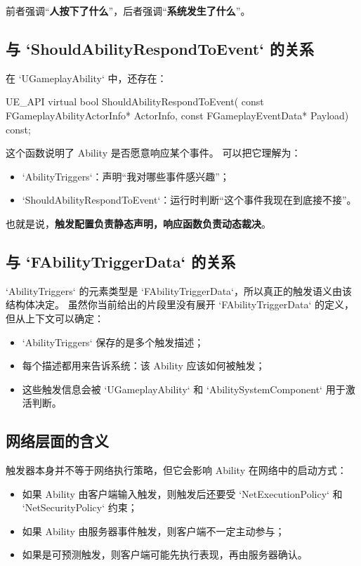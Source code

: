 \documentclass[10pt,CJKmath]{ctexart}
\begin{document}
前者强调“\textbf{人按下了什么}”，后者强调“\textbf{系统发生了什么}”。

\subsection{与 `ShouldAbilityRespondToEvent` 的关系}

在 `UGameplayAbility` 中，还存在：

\begin{code}
	UE_API virtual bool ShouldAbilityRespondToEvent(
	const FGameplayAbilityActorInfo* ActorInfo,
	const FGameplayEventData* Payload) const;
\end{code}

这个函数说明了 Ability 是否愿意响应某个事件。  
可以把它理解为：

\begin{itemize}
	\item `AbilityTriggers`：声明“我对哪些事件感兴趣”；
	\item `ShouldAbilityRespondToEvent`：运行时判断“这个事件我现在到底接不接”。
\end{itemize}

也就是说，\textbf{触发配置负责静态声明，响应函数负责动态裁决}。

\subsection{与 `FAbilityTriggerData` 的关系}

`AbilityTriggers` 的元素类型是 `FAbilityTriggerData`，所以真正的触发语义由该结构体决定。  
虽然你当前给出的片段里没有展开 `FAbilityTriggerData` 的定义，但从上下文可以确定：

\begin{itemize}
	\item `AbilityTriggers` 保存的是多个触发描述；
	\item 每个描述都用来告诉系统：该 Ability 应该如何被触发；
	\item 这些触发信息会被 `UGameplayAbility` 和 `AbilitySystemComponent` 用于激活判断。
\end{itemize}

\subsection{网络层面的含义}

触发器本身并不等于网络执行策略，但它会影响 Ability 在网络中的启动方式：

\begin{itemize}
	\item 如果 Ability 由客户端输入触发，则触发后还要受 `NetExecutionPolicy` 和 `NetSecurityPolicy` 约束；
	\item 如果 Ability 由服务器事件触发，则客户端不一定主动参与；
	\item 如果是可预测触发，则客户端可能先执行表现，再由服务器确认。
\end{itemize}
\end{document}

